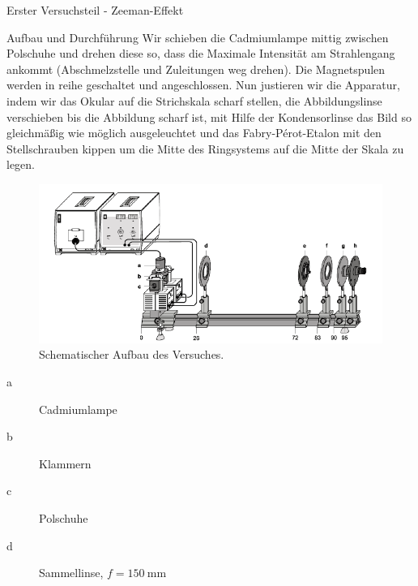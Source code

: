 \documentclass[pdftex, a4paper,11pt, twoside, ngerman]{report}
\begin{document}
         
         
  \begin{chapter}{Erster Versuchsteil - Zeeman-Effekt}
    \label{chp:Photoeffekt}
   
   
   
    \begin{section}{Aufbau und Durchführung}
      \label{chp:photoeffekt:sec:AufbauJustage}
      Wir schieben die Cadmiumlampe mittig zwischen Polschuhe und drehen diese
      so, dass die Maximale Intensität am Strahlengang ankommt (Abschmelzstelle
      und Zuleitungen weg drehen). Die Magnetspulen werden in reihe geschaltet
      und angeschlossen. Nun justieren wir die Apparatur, indem wir das Okular
      auf die Strichskala scharf stellen, die Abbildungslinse verschieben bis
      die Abbildung scharf ist, mit Hilfe der Kondensorlinse das Bild so
      gleichmäßig wie möglich ausgeleuchtet und das Fabry-Pérot-Etalon mit den
      Stellschrauben kippen um die Mitte des Ringsystems auf die Mitte der Skala
      zu legen.
      \begin{figure}[ht]
        \centering
        \includegraphics[width=\textwidth]
            {Figures/ZeemanAufbau.PNG}
        \caption{Schematischer Aufbau des Versuches.}
        \label{fig:ZeemanAufbau}
      \end{figure}
      \newline
      \begin{minipage}{0.4\textwidth}
        \begin{description}
          \item[a] Cadmiumlampe
          \item[b] Klammern
          \item[c] Polschuhe
          \item[d] Sammellinse, $f=\SI{150}{\milli\meter}$

\end{description}
\end{minipage}
\end{section}
\end{chapter}
\end{document}
